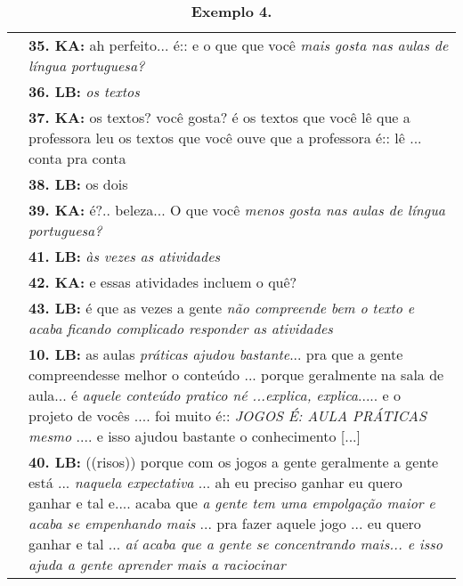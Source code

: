\begin{table}[!htpb]
	\centering
	\small
	\begin{threeparttable}
		\caption*{\textbf{Exemplo 4.} }
		\label{tab-05}
		\begin{tabular}{@{} 
				>{\raggedright\arraybackslash}p{} 
				>{\raggedright\arraybackslash}p{} @{}}
			\toprule\noalign{}
			\multirow{2}{*}{Luiza Bairros: compreensão de aula de LP} \linebreak
			\\
			\midrule\noalign{}
			
			\multirow{8}{*}{1ª} & \textbf{35. KA: }ah perfeito... é:: e o que que você \emph{mais gosta nas aulas de língua portuguesa?} \\
			& \textbf{36. LB: }\emph{os textos} \\
			
			& \textbf{37. KA: }os textos? você gosta? é os textos que você lê que a professora leu os textos que você ouve que a professora é:: lê ... conta pra conta \\
			
			& \textbf{38. LB: }os dois \\
			
			& \textbf{39. KA:} é?.. beleza... O que você \emph{menos gosta nas aulas de língua portuguesa?} \\
			
			& \textbf{41. LB:} \emph{às vezes as atividades} \\
			
			& \textbf{42. KA:} e essas atividades incluem o quê? \\
			
			& \textbf{43. LB:} é que as vezes a gente \emph{não compreende bem o texto e acaba ficando complicado responder as atividades} \\
            \midrule
			
			\multirow{2}{*}{2ª} & \textbf{10. LB:} as aulas \emph{práticas ajudou bastante}... pra que a gente compreendesse melhor o conteúdo ... porque geralmente na sala de aula... é \emph{aquele conteúdo pratico né ...explica, explica}..... e o projeto de vocês .... foi muito é:: \emph{JOGOS É: AULA PRÁTICAS mesmo} .... e isso ajudou bastante o conhecimento {[}...{]} \\
			
			& \textbf{40. LB:} ((risos)) porque com os jogos a gente geralmente a gente está ... \emph{naquela expectativa} ... ah eu preciso ganhar eu quero ganhar e tal e.... acaba que \emph{a gente tem uma empolgação maior e acaba se empenhando mais} ... pra fazer aquele jogo ... eu quero ganhar e tal ... \emph{aí acaba que a gente se concentrando mais... e isso ajuda a gente aprender mais a raciocinar} \\
			
			\bottomrule
		\end{tabular}
	\end{threeparttable}
\end{table}
